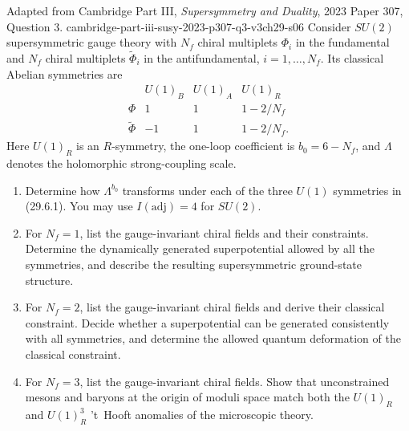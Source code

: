 \begin{enumerate}
    {Adapted from Cambridge Part III, \emph{Supersymmetry and Duality},
    2023 Paper 307, Question 3.}
    {cambridge-part-iii-susy-2023-p307-q3-v3ch29-s06}
  Consider \(SU(2)\) supersymmetric gauge theory with \(N_f\) chiral
  multiplets \(\Phi_i\) in the fundamental and \(N_f\) chiral
  multiplets \(\widetilde\Phi_i\) in the antifundamental,
  \(i=1,\ldots,N_f\).  Its classical Abelian symmetries are
  \[
  \begin{array}{c|ccc}
       &U(1)_B&U(1)_A&U(1)_R\\ \hline
    \Phi&1&1&1-2/N_f\\
    \widetilde\Phi&-1&1&1-2/N_f .
  \end{array}
  \tag{29.6.1}
  \]
  Here \(U(1)_R\) is an \(R\)-symmetry, the one-loop coefficient is
  \(b_0=6-N_f\), and \(\Lambda\) denotes the holomorphic strong-coupling
  scale.
  \begin{enumerate}
    \item Determine how \(\Lambda^{b_0}\) transforms under each of the
    three \(U(1)\) symmetries in (29.6.1).  You may use
    \(I(\mathrm{adj})=4\) for \(SU(2)\).

    \item For \(N_f=1\), list the gauge-invariant chiral fields and their
    constraints.  Determine the dynamically generated superpotential
    allowed by all the symmetries, and describe the resulting
    supersymmetric ground-state structure.

    \item For \(N_f=2\), list the gauge-invariant chiral fields and derive
    their classical constraint.  Decide whether a superpotential can be
    generated consistently with all symmetries, and determine the allowed
    quantum deformation of the classical constraint.

    \item For \(N_f=3\), list the gauge-invariant chiral fields.  Show that
    unconstrained mesons and baryons at the origin of moduli space match
    both the \(U(1)_R\) and \(U(1)_R^3\) 't~Hooft anomalies of the
    microscopic theory.
  \end{enumerate}


\end{enumerate}
